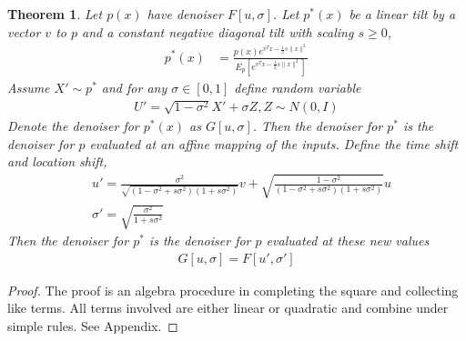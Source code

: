 \documentclass[10pt,a4paper]{amsart}
\newtheorem{theorem}{Theorem}
\begin{document}
\begin{theorem}\label{main_denoiser_thm}
Let $p(x)$ have denoiser $F[u,\sigma]$. Let $p^{*}(x)$ be a linear tilt by a vector $v$ to $p$ and a constant negative diagonal tilt with scaling $s \geq 0$,
\begin{align}
p^{*}(x)&= \frac{p(x)e^{v^{T}x - \frac{1}{2}s \|x\|^{2}}}{E_{p}[e^{v^{T}x - \frac{1}{2}s \|x\|^{2}}]} \label{const_neg_daig_tilt}
\end{align}
Assume $X' \sim p^{*}$ and for any $\sigma \in [0,1]$ define random variable
\begin{align}
U' = \sqrt{1-\sigma^{2}}X'+\sigma Z, Z \sim N(0,I)
\end{align}
Denote the denoiser for $p^{*}(x)$ as $G[u,\sigma]$. Then the denoiser for $p^{*}$ is the denoiser for $p$ evaluated at an affine mapping of the inputs. Define the time shift and location shift,
\begin{align}
&u'=\frac{\sigma^{2}}{\sqrt{(1-\sigma^{2}+s \sigma^{2})(1+s \sigma^{2})}} v+ \sqrt{\frac{1-\sigma^{2}}{(1-\sigma^{2}+s \sigma^{2})(1+s \sigma^{2})}} u \label{u_prime}\\ 
&\sigma'=\sqrt{\frac{\sigma^{2}}{1+s \sigma^{2}}} \label{sigma_prime}
\end{align}
Then the denoiser for $p^{*}$ is the denoiser for $p$ evaluated at these new values
\begin{align}
G[u,\sigma]= F[u', \sigma']
\end{align}
\end{theorem}

\begin{proof}
The proof is an algebra procedure in completing the square and collecting like terms. All terms involved are either linear or quadratic and combine under simple rules. See Appendix.
\end{proof}
\end{document}
